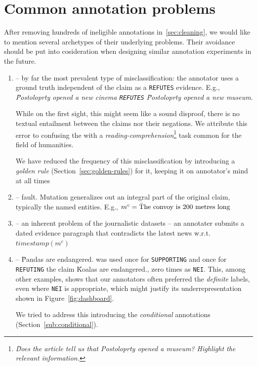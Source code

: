 \section{Common annotation problems}
\label{sec:annot_problems}
After removing hundreds of ineligible annotations in~\ref{sec:cleaning}, we would like to mention several archetypes of their underlying problems. Their avoidance should be put into cosideration when designing similar annotation experiments in the future.
\begin{enumerate}
    \item {} -- by far the most prevalent type of misclassification: the annotator uses a ground truth independent of the claim as a \texttt{REFUTES} evidence. E.g., \textit{\"{Postoloprty opened a new cinema} \texttt{REFUTES} \"{Postoloprty opened a new museum}}.
    
    While on the first sight, this might seem like a sound disproof, there is no textual entailment between the claims nor their negations. We attribute this error to confusing the \tdva{} with a \textit{reading-comprehension}\footnote{\textit{\"{Does the article tell us that Postoloprty opened a museum? Highlight the relevant information.}}} task common for the field of humanities.
    
    We have reduced the frequency of this misclassification by introducing a \textit{golden rule} (Section~\ref{sec:golden-rules}) for it, keeping it on annotator's mind at all times
    \item {} --  fault. Mutation generalizes out an integral part of the original claim, typically the named entities. E.g., $m^c=\text{\"{The convoy is 200 metres long}}$ 
    \item {} -- an inherent problem of the journalistic datasets -- an annotater submits a dated evidence paragraph that contradicts the latest news w.r.t. $timestamp(m^c)$
    \item {} -- \"{Pandas are endangered.} was used once for \texttt{SUPPORTING} and once for \texttt{REFUTING} the claim \"{Koalas are endangered.}, zero times as \texttt{NEI}.  This, among other examples, shows that our annotators often preferred the \textit{definite} labels, even where \texttt{NEI} is appropriate, which might justify its underrepresentation shown in Figure~\ref{fig:dashboard}.
    
    We tried to address this introducing the \textit{conditional} annotations (Section~\ref{sub:conditional}).
\end{enumerate}


